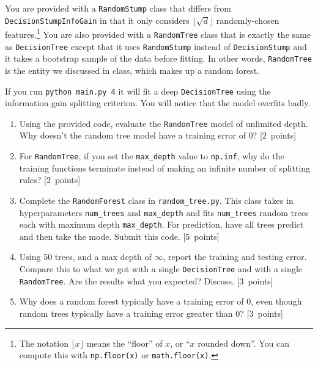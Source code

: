 \documentclass{article}
\newcommand{\blu}[1]{{\textcolor{blu}{#1}}}
\let\ask\blu
\newcommand\pts[1]{\textcolor{pointscolour}{[#1~points]}}
\begin{document}
    You are provided with a \texttt{RandomStump} class that differs from
    \texttt{DecisionStumpInfoGain} in that
    it only considers $\lfloor \sqrt{d} \rfloor$ randomly-chosen features.\footnote{The notation $\lfloor x\rfloor$ means the ``floor'' of $x$, or ``$x$ rounded down''. You can compute this with \texttt{np.floor(x)} or \texttt{math.floor(x)}.}
    You are also provided with a \texttt{RandomTree} class that is exactly the same as
    \texttt{DecisionTree} except that it uses \texttt{RandomStump} instead of
    \texttt{DecisionStump} and it takes a bootstrap sample of the data before fitting.
    In other words, \texttt{RandomTree} is the entity we discussed in class, which
    makes up a random forest.

    If you run \texttt{python main.py 4} it will fit a deep \texttt{DecisionTree}
    using the information gain splitting criterion. You will notice that the model overfits badly.




    \begin{enumerate}
        \item Using the provided code, evaluate the \texttt{RandomTree} model of unlimited depth. \ask{Why doesn't the random tree model have a training error of 0?} \pts{2}
        \item For \texttt{RandomTree}, if you set the \texttt{max\_depth} value to \texttt{np.inf}, \ask{why do the training functions terminate instead of making an infinite number of splitting rules?} \pts{2}
        \item Complete the \texttt{RandomForest} class in \texttt{random\string_tree.py}. This class takes in hyperparameters \texttt{num\string_trees} and \texttt{max\string_depth} and
        fits \texttt{num\string_trees} random trees each with maximum depth \texttt{max\string_depth}. For prediction, have all trees predict and then take the mode. \ask{Submit this code.} \pts{5}

        \item Using 50 trees, and a max depth of $\infty$, \ask{report the training and testing error}. Compare this to what we got with a single \texttt{DecisionTree} and with a single \texttt{RandomTree}. \ask{Are the results what you expected? Discuss.} \pts{3}
        \item \ask{Why does a random forest typically have a training error of 0, even though random trees typically have a training error greater than 0?} \pts{3}
    \end{enumerate}
\end{document}

